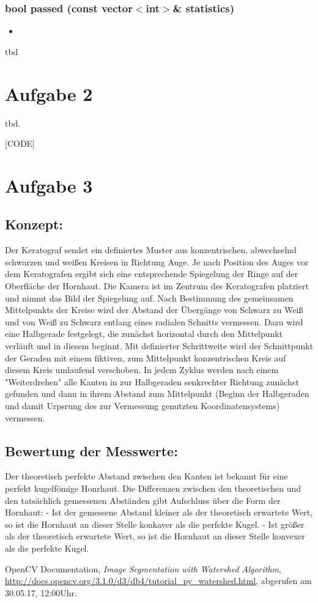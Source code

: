 \documentclass{../Vorlage/sebDenCls}
\begin{document}
\subsubsection{bool passed (const vector$<$int$>$\& statistics)}
\begin{itemize}
	\item 
\end{itemize}
tbd

\section*{Aufgabe 2}

tbd.

[CODE]

\section*{Aufgabe 3}

\subsection{Konzept:}
Der Keratograf sendet ein definiertes Muster aus konzentrischen, abwechselnd schwarzen und weißen Kreisen in Richtung Auge. Je nach Position des Auges vor dem Keratografen ergibt sich eine entsprechende Spiegelung der Ringe auf der Oberfläche der Hornhaut. Die Kamera ist im Zentrum des Keratografen platziert und nimmt das Bild der Spiegelung auf. Nach Bestimmung des gemeinsamen Mittelpunkts der Kreise wird der Abstand der Übergänge von Schwarz zu Weiß und von Weiß zu Schwarz entlang eines radialen Schnitts vermessen. Dazu wird eine Halbgerade festgelegt, die zunächst horizontal durch den Mittelpunkt verläuft und in diesem beginnt. Mit definierter Schrittweite wird der Schnittpunkt der Geraden mit einem fiktiven, zum Mittelpunkt konzentrischen Kreis auf diesem Kreis umlaufend verschoben. In jedem Zyklus werden nach einem "Weiterdrehen" alle Kanten in zur Halbgeraden senkrechter Richtung zunächst gefunden und dann in ihrem Abstand zum Mittelpunkt (Beginn der Halbgeraden und damit Urpsrung des zur Vermessung genutzten Koordinatensystems) vermessen. 

\subsection{Bewertung der Messwerte:}
Der theoretisch perfekte Abstand zwischen den Kanten ist bekannt für eine perfekt kugelfömige Honrhaut. Die Differenzen zwischen den theoretischen und den tatsächlich gemessenen Abständen gibt Aufschluss über die Form der Hornhaut: 
- Ist der gemessene Abstand kleiner als der theoretisch erwartete Wert, so ist die Hornhaut an dieser Stelle konkaver als die perfekte Kugel.
- Ist größer als der theoretisch erwartete Wert, so ist die Hornhaut an dieser Stelle konvexer als die perfekte Kugel.

\begin{thebibliography}{9}
	
		OpenCV Documentation,
		\emph{Image Segmentation with Watershed Algorithm},
		\url{http://docs.opencv.org/3.1.0/d3/db4/tutorial_py_watershed.html},
		abgerufen am 30.05.17, 12:00Uhr.
	
\end{thebibliography}
\end{document}
